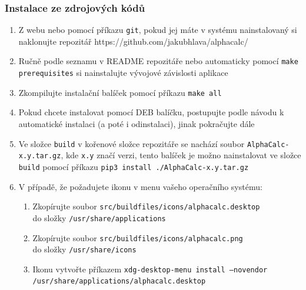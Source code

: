 \documentclass[a4paper, 12pt]{article}
\begin{document}
        \subsubsection{Instalace ze zdrojových kódů}
            \begin{enumerate}
                \item Z webu nebo pomocí příkazu \texttt{git}, pokud jej máte v systému nainstalovaný si naklonujte repozitář https://github.com/jakubhlava/alphacalc/
                \item Ručně podle seznamu v README repozitáře nebo automaticky pomocí \texttt{make prerequisites} si nainstalujte vývojové závislosti aplikace
                \item Zkompilujte instalační balíček pomocí příkazu \texttt{make all}
                \item Pokud chcete instalovat pomocí DEB balíčku, postupujte podle návodu k automatické instalaci (a poté i odinstalaci), jinak pokračujte dále
                \item Ve složce \texttt{build} v kořenové složce repozitáře se nachází soubor \texttt{AlphaCalc-x.y.tar.gz}, kde \texttt{x.y} značí verzi, tento balíček je možno nainstalovat ve složce \texttt{build} pomocí příkazu \texttt{pip3 install ./AlphaCalc-x.y.tar.gz}
                \item V případě, že požadujete ikonu v menu vašeho operačního systému:
                \begin{enumerate}
                \item Zkopírujte soubor \texttt{src/buildfiles/icons/alphacalc.desktop} \\
                do složky \texttt{/usr/share/applications}
                \item Zkopírujte soubor \texttt{src/buildfiles/icons/alphacalc.png} \\
                do složky \texttt{/usr/share/icons}
                \item Ikonu vytvořte příkazem \texttt{xdg-desktop-menu install --novendor \\
                 /usr/share/applications/alphacalc.desktop}
                \end{enumerate}
            \end{enumerate}
\end{document}
